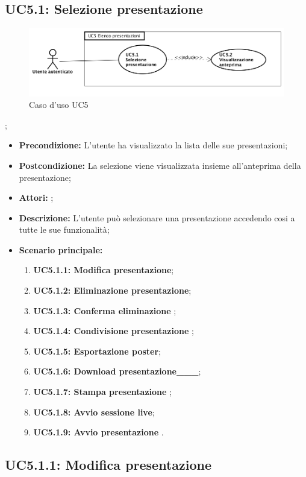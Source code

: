 \subsection{ UC5.1: Selezione presentazione}

\begin{figure}[h]
	\begin{center}
	\includegraphics[scale=0.4]{diagram/UC5.png}
	\caption{Caso d'uso UC5}
	\end{center}
\end{figure};
\begin{itemize}
	\item \textbf{Precondizione:} L'utente ha visualizzato la lista delle sue presentazioni;
	\item \textbf{Postcondizione:} La selezione viene visualizzata insieme all'anteprima della presentazione;
	\item \textbf{Attori:} ;
	\item \textbf{Descrizione:} L'utente può selezionare una presentazione accedendo cosi a tutte le sue funzionalità;
	\item \textbf{Scenario principale:}
	\begin{enumerate}
		\item \textbf{ UC5.1.1: Modifica presentazione};
		\item \textbf{ UC5.1.2: Eliminazione presentazione};
		\item \textbf{ UC5.1.3: Conferma eliminazione };
		\item \textbf{ UC5.1.4: Condivisione presentazione };
		\item \textbf{ UC5.1.5: Esportazione poster};
		\item \textbf{ UC5.1.6: Download presentazione___};
		\item \textbf{ UC5.1.7: Stampa presentazione };
		\item \textbf{ UC5.1.8: Avvio sessione live};
		\item \textbf{ UC5.1.9: Avvio presentazione }.
	\end{enumerate}
\end{itemize}
\subsection{ UC5.1.1: Modifica presentazione}

